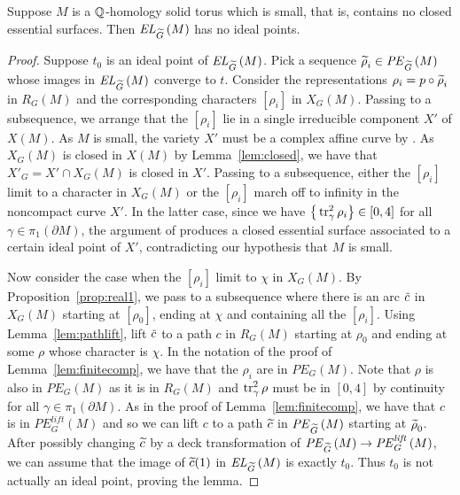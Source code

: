 \documentclass[tikz, sepfignums, defaultenums]{nmd/article}
\newcommand{\RG}[1]{\mathit{R}_{G}\left(#1\right)}
\newcommand{\XG}[1]{\mathit{X}_{G}\left(#1\right)}
\newcommand{\RGPE}[1]{\mathit{PE}_{G}\left(#1\right)}
\newcommand{\RGlift}[1]{\mathit{PE}^{\mathit{lift}}_{G}\left(#1\right)}
\newcommand{\RGtilPE}[1]{\mathit{PE}_{\Gtil}\left(#1\right)}
\newcommand{\TEL}[1]{\mathit{EL}_\Gtil\left(#1\right)}
\begin{document}
\begin{lemma}
  \label{lem:smallnoideal}
  Suppose $M$ is a ${\mathbb Q}$-homology solid torus which is small, that is,
  contains no closed essential surfaces.  Then $\TEL{M}$ has no ideal
  points. 
\end{lemma}

\begin{proof}
Suppose $t_0$ is an ideal point of $\TEL{M}$.  Pick a sequence
$\rhotil_i \in \RGtilPE{M}$ whose images in $\TEL{M}$ converge to $t$.
Consider the representations $\rho_i = p \circ \rhotil_i$ in $\RG{M}$
and the corresponding characters $[\rho_i]$ in $\XG{M}$. Passing to a
subsequence, we arrange that the $[\rho_i]$ lie in a single
irreducible component $X'$ of $X(M)$.  As $M$ is small, the variety
$X'$ must be a complex affine curve by \cite[\S 2.4]{CCGLS}.  As
$\XG{M}$ is closed in $X(M)$ by Lemma~\ref{lem:closed}, we have that
$X'_G = X' \cap \XG{M}$ is closed in $X'$.  Passing to a subsequence,
either the $[\rho_i]$ limit to a character in $\XG{M}$ or the
$[\rho_i]$ march off to infinity in the noncompact curve $X'$.  In the
latter case, since we have
$\big\{ \operatorname{tr}^2_\gamma \rho_i \big\} \in [0, 4]$ for all
$\gamma \in \pi_1(\partial M)$, the argument of \cite[\S 2.4]{CCGLS}
produces a closed essential surface associated to a certain ideal
point of $X'$, contradicting our hypothesis that $M$ is small.

Now consider the case when the $[\rho_i]$ limit to $\chi$ in $\XG{M}$.
By Proposition~\ref{prop:real1}, we pass to a subsequence where there
is an arc $\cbar$ in $\XG{M}$ starting at $[\rho_0]$, ending at $\chi$
and containing all the $[\rho_i]$.  Using Lemma~\ref{lem:pathlift},
lift $\cbar$ to a path $c$ in $\RG{M}$ starting at $\rho_0$ and ending
at some $\rho$ whose character is $\chi$.  In the notation of the
proof of Lemma~\ref{lem:finitecomp}, we have that the $\rho_i$ are in
$\RGPE{M}$.  Note that $\rho$ is also in $\RGPE{M}$ as it is in
$\RG{M}$ and $\operatorname{tr}^2_\gamma \rho$ must be in $[0, 4]$ by continuity for
all $\gamma \in \pi_1(\partial M)$.  As in the proof of
Lemma~\ref{lem:finitecomp}, we have that $c$ is in $\RGlift{M}$ and so
we can lift $c$ to a path $\ctil$ in $\RGtilPE{M}$ starting at
$\rhotil_0$.  After possibly changing $\ctil$ by a deck transformation
of $\RGtilPE{M} \to \RGlift{M}$, we can assume that the image of
$\ctil(1)$ in $\TEL{M}$ is exactly $t_0$.  Thus $t_0$ is not actually
an ideal point, proving the lemma.
\end{proof}
\end{document}
